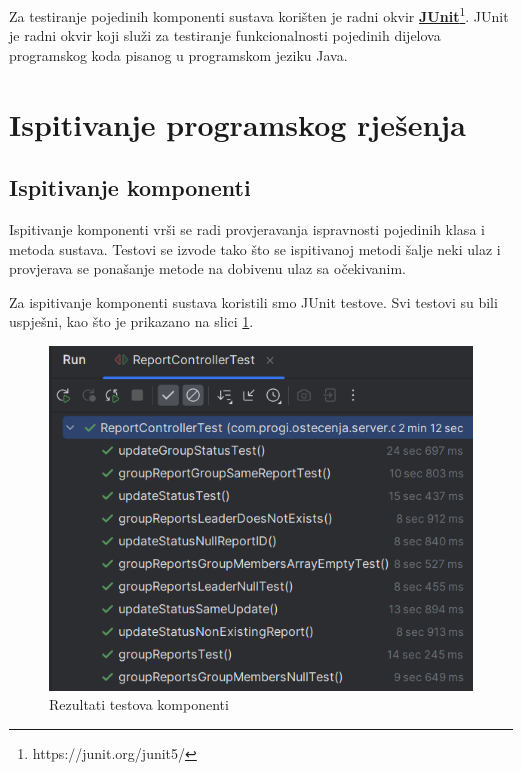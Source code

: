 			Za testiranje pojedinih komponenti sustava korišten je radni okvir \href{https://junit.org/junit5/}{\textbf{JUnit}}\footnote{https://junit.org/junit5/}. JUnit je radni okvir koji služi za testiranje funkcionalnosti pojedinih dijelova programskog koda pisanog u programskom jeziku Java.
			
			\eject 
		
	
		\section{Ispitivanje programskog rješenja}
			
			\subsection{Ispitivanje komponenti}
			
			Ispitivanje komponenti vrši se radi provjeravanja ispravnosti pojedinih klasa i metoda sustava. Testovi se izvode tako što se ispitivanoj metodi šalje neki ulaz i provjerava se ponašanje metode na dobivenu ulaz sa očekivanim.
			
			Za ispitivanje komponenti sustava koristili smo JUnit testove. Svi testovi su bili uspješni, kao što je prikazano na slici \ref{fig:JUnitTestovi}.
			
			\begin{figure}[H]
				\includegraphics[width=\textwidth]{slike/JUnitTestoviRez.png} %
				\caption{Rezultati testova komponenti}
				\label{fig:JUnitTestovi} %
			\end{figure}
			
